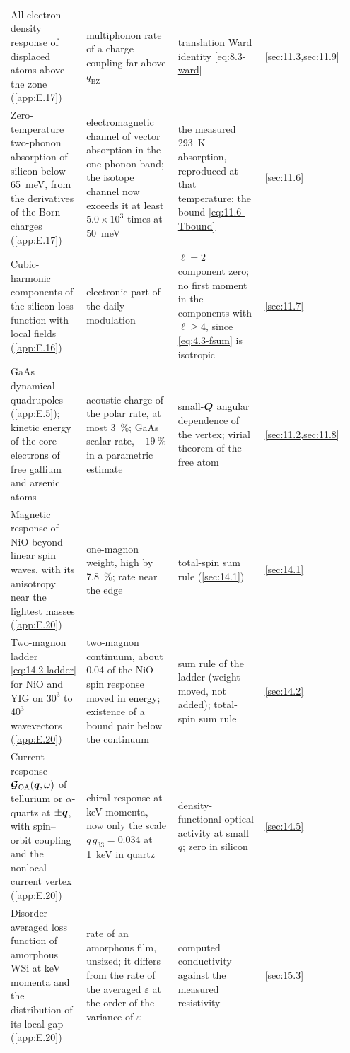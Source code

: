 {\begin{longtable}{@{}>{\raggedright\arraybackslash}p{0.25\linewidth}>{\raggedright\arraybackslash}p{0.305\linewidth}>{\raggedright\arraybackslash}p{0.305\linewidth}>{\raggedright\arraybackslash}p{0.09\linewidth}@{}}
  All-electron density response of displaced atoms above the zone (\cref{app:E.17}) & multiphonon rate of a charge coupling far above $q_{\mathrm{BZ}}$ & translation Ward identity \cref{eq:8.3-ward} & \cref{sec:11.3,sec:11.9} \\
  Zero-temperature two-phonon absorption of silicon below \SI{65}{meV}, from the derivatives of the Born charges (\cref{app:E.17}) & electromagnetic channel of vector absorption in the one-phonon band; the isotope channel now exceeds it at least $5.0\times10^3$ times at \SI{50}{meV} & the measured \SI{293}{K} absorption, reproduced at that temperature; the bound \cref{eq:11.6-Tbound} & \cref{sec:11.6} \\
  Cubic-harmonic components of the silicon loss function with local fields (\cref{app:E.16}) & electronic part of the daily modulation & $\ell = 2$ component zero; no first moment in the components with $\ell \ge 4$, since \cref{eq:4.3-fsum} is isotropic & \cref{sec:11.7} \\
  GaAs dynamical quadrupoles (\cref{app:E.5}); kinetic energy of the core electrons of free gallium and arsenic atoms & acoustic charge of the polar rate, at most \SI{3}{\percent}; GaAs scalar rate, $-\SI{19}{\percent}$ in a parametric estimate & small-$\bm{Q}$ angular dependence of the vertex; virial theorem of the free atom & \cref{sec:11.2,sec:11.8} \\
  Magnetic response of NiO beyond linear spin waves, with its anisotropy near the lightest masses (\cref{app:E.20}) & one-magnon weight, high by \SI{7.8}{\percent}; rate near the edge & total-spin sum rule (\cref{sec:14.1}) & \cref{sec:14.1} \\
  Two-magnon ladder \cref{eq:14.2-ladder} for NiO and YIG on $30^3$ to $40^3$ wavevectors (\cref{app:E.20}) & two-magnon continuum, about 0.04 of the NiO spin response moved in energy; existence of a bound pair below the continuum & sum rule of the ladder (weight moved, not added); total-spin sum rule & \cref{sec:14.2} \\
  Current response $\boldsymbol{\mathcal{G}}_{\mathrm{OA}}(\bm{q},\omega)$ of tellurium or $\alpha$-quartz at $\pm\bm{q}$, with spin--orbit coupling and the nonlocal current vertex (\cref{app:E.20}) & chiral response at keV momenta, now only the scale $q\,g_{33} = 0.034$ at \SI{1}{keV} in quartz & density-functional optical activity at small $q$; zero in silicon & \cref{sec:14.5} \\
  Disorder-averaged loss function of amorphous WSi at keV momenta and the distribution of its local gap (\cref{app:E.20}) & rate of an amorphous film, unsized; it differs from the rate of the averaged $\varepsilon$ at the order of the variance of $\varepsilon$ & computed conductivity against the measured resistivity & \cref{sec:15.3} \\

\end{longtable}}
